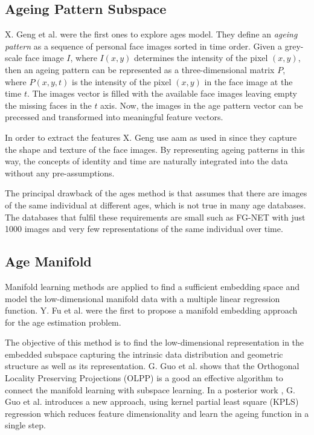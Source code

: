 \subsection{Ageing Pattern Subspace}\label{subsec:APS}

X. Geng et al. \cite{4359348, Geng:2006:LFA:1180639.1180711} were the first ones to explore \gls{ages} model. They define an \textit{ageing pattern} as a sequence of personal face images sorted in time order. Given a grey-scale face image $I$, where $I(x,y)$ determines the intensity of the pixel $(x,y)$, then an ageing pattern can be represented as a three-dimensional matrix $P$, where $P(x,y,t)$ is the intensity of the pixel $(x,y)$ in the face image at the time $t$. The images vector is filled with the available face images leaving empty the missing faces in the $t$ axis. Now, the images in the age pattern vector can be precessed and transformed into meaningful feature vectors.

In order to extract the features X. Geng use \gls{aam} as used in \cite{791208} since they capture the shape and texture of the face images. By representing ageing patterns in this way, the concepts of identity and time are naturally integrated into the data without any pre-assumptions.

The principal drawback of the \gls{ages} method is that assumes that there are images of the same individual at different ages, which is not true in many age databases. The databases that fulfil these requirements are small such as FG-NET \cite{FGNET} with just 1000 images and very few representations of the same individual over time.

\subsection{Age Manifold}\label{subsec:manifold}
 
Manifold learning methods are applied to find a sufficient embedding space and model the low-dimensional manifold data with a multiple linear regression function. Y. Fu et al. \cite{4523958, 4284917} were the first to propose a manifold embedding approach for the age estimation problem. 

The objective of this method is to find the low-dimensional representation in the embedded subspace capturing the intrinsic data distribution and geometric structure as well as its representation. G. Guo et al. \cite{Guo:2008:IHA:2319085.2321608} \cite{4531189} shows that the Orthogonal Locality Preserving Projections (OLPP) \cite{CHHZ06}  is a good an effective algorithm  to connect the manifold learning with subspace learning. In a posterior work \cite{5995404}, G. Guo et al. introduces a new approach, using kernel partial least square (KPLS) regression which reduces feature dimensionality and learn the ageing function in a single step.

